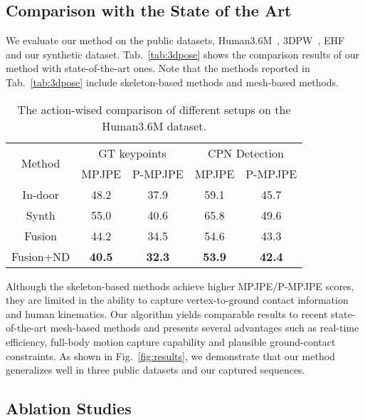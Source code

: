 \documentclass[10pt,twocolumn,letterpaper]{article}
\begin{document}
\subsection{Comparison with the State of the Art}
We evaluate our method on the public datasets, Human3.6M~\cite{ionescu2014human3}, 3DPW~\cite{vonMarcard2018}, EHF~\cite{SMPL-X:2019} and our synthetic dataset.
Tab.~\ref{tab:3dpose} shows the comparison results of our method with state-of-the-art ones.
Note that the methods reported in Tab.~\ref{tab:3dpose} include skeleton-based methods and mesh-based methods.
\begin{table}[ht!]
\caption{The action-wised comparison of different setups on the Human3.6M dataset.}
\centering
\begin{tabular}{c|cc|cc}
\toprule
\multicolumn{1}{c}{\multirow{2}[4]{*}{Method}} & \multicolumn{2}{c}{GT keypoints} & \multicolumn{2}{c}{CPN Detection} \\
\cmidrule{2-5} \multicolumn{1}{c}{}   & MPJPE  & \multicolumn{1}{c}{P-MPJPE}  & MPJPE & P-MPJPE \\ \midrule
In-door  & 48.2 & 37.9  &59.1 & 45.7\\
Synth  & 55.0 & 40.6  & 65.8 &  49.6\\
Fusion & 44.2 & 34.5  & 54.6 & 43.3 \\
Fusion+ND  &  \textbf{40.5} &  \textbf{32.3} & \textbf{53.9} & \textbf{42.4}\\
\bottomrule
\end{tabular}
\vspace{-3mm}
\label{tab:h36m_action}
\end{table}
Although the skeleton-based methods achieve higher MPJPE/P-MPJPE scores, they are limited in the ability to capture vertex-to-ground contact information and human kinematics.
Our algorithm yields comparable results to recent state-of-the-art mesh-based methods and presents several advantages such as real-time efficiency, full-body motion capture capability and plausible ground-contact constraints.
As shown in Fig.~\ref{fig:results}, we demonstrate that our method generalizes well in three public datasets and our captured sequences.








\subsection{Ablation Studies}
\end{document}

